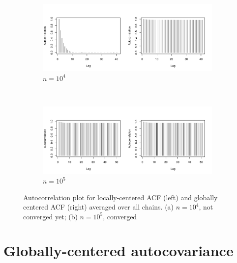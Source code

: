 \documentclass[11pt]{article}
\theoremstyle{remark}
\begin{document}
\begin{figure}[htbp]
\begin{subfigure}{\textwidth}
   \centering
   \includegraphics[width=.9\linewidth]{plots/gaussian-acf_n1e4.pdf}
   \caption{$n = 10^4$}
   \label{subfig:gauss-acf-1e4}
 \end{subfigure}\\
 \begin{subfigure}{\textwidth}
   \centering
   \includegraphics[width=.9\linewidth]{plots/gaussian-acf_n1e5.pdf} 
   \caption{$n = 10^5$}
   \label{subfig:gauss-acf-1e5}
 \end{subfigure}
 \caption{Autocorrelation plot for locally-centered ACF (left) and globally centered ACF (right) averaged over all chains. (a) $n = 10^4$, not converged yet; (b) $n =  10^5$, converged}
 \label{fig:gauss:acf}
\end{figure}




\section{Globally-centered autocovariance} \label{sec:G-ACF}
\end{document}
